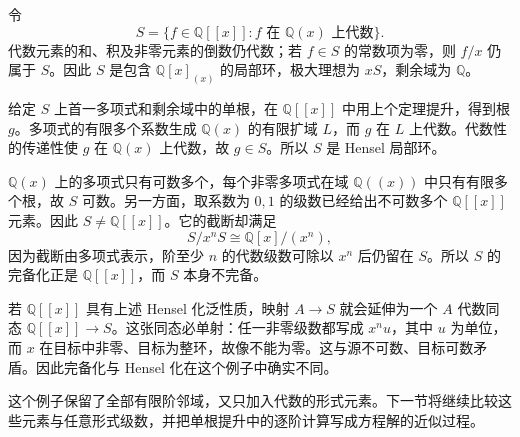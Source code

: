 \begin{example}\label{g5:exm:henselian-not-complete}
	令
	\[
		S=\{f\in\mathbb Q[[x]]:f\text{ 在 }\mathbb Q(x)\text{ 上代数}\}.
	\]
	代数元素的和、积及非零元素的倒数仍代数；若 \(f\in S\) 的常数项为零，则 \(f/x\) 仍属于 \(S\)。因此 \(S\) 是包含 \(\mathbb Q[x]_{(x)}\) 的局部环，极大理想为 \(xS\)，剩余域为 \(\mathbb Q\)。

	给定 \(S\) 上首一多项式和剩余域中的单根，在 \(\mathbb Q[[x]]\) 中用上个定理提升，得到根 \(g\)。多项式的有限多个系数生成 \(\mathbb Q(x)\) 的有限扩域 \(L\)，而 \(g\) 在 \(L\) 上代数。代数性的传递性使 \(g\) 在 \(\mathbb Q(x)\) 上代数，故 \(g\in S\)。所以 \(S\) 是 Hensel 局部环。

	\(\mathbb Q(x)\) 上的多项式只有可数多个，每个非零多项式在域 \(\mathbb Q((x))\) 中只有有限多个根，故 \(S\) 可数。另一方面，取系数为 \(0,1\) 的级数已经给出不可数多个 \(\mathbb Q[[x]]\) 元素。因此 \(S\ne\mathbb Q[[x]]\)。它的截断却满足
	\[
		S/x^nS\cong\mathbb Q[x]/(x^n),
	\]
	因为截断由多项式表示，阶至少 \(n\) 的代数级数可除以 \(x^n\) 后仍留在 \(S\)。所以 \(S\) 的完备化正是 \(\mathbb Q[[x]]\)，而 \(S\) 本身不完备。

	若 \(\mathbb Q[[x]]\) 具有上述 Hensel 化泛性质，映射 \(A\to S\) 就会延伸为一个 \(A\) 代数同态 \(\mathbb Q[[x]]\to S\)。这张同态必单射：任一非零级数都写成 \(x^n u\)，其中 \(u\) 为单位，而 \(x\) 在目标中非零、目标为整环，故像不能为零。这与源不可数、目标可数矛盾。因此完备化与 Hensel 化在这个例子中确实不同。
\end{example}

这个例子保留了全部有限阶邻域，又只加入代数的形式元素。下一节将继续比较这些元素与任意形式级数，并把单根提升中的逐阶计算写成方程解的近似过程。
